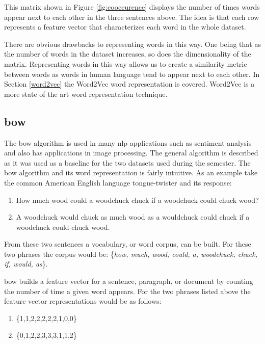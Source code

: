 \documentclass[12pt]{article}
\begin{document}
This matrix shown in Figure \ref{fig:cooccurence} displays the number of times words appear next to each other in the three sentences above. The idea is that each row represents a feature vector that characterizes each word in the whole dataset.

There are obvious drawbacks to representing words in this way. One being that as the number of words in the dataset increases, so does the dimensionality of the matrix. Representing words in this way allows us to create a similarity metric between words as words in human language tend to appear next to each other. In Section \ref{word2vec} the Word2Vec word representation is covered. Word2Vec is a more state of the art word representation technique.

\subsection {\ac{bow}}

The \ac{bow} algorithm is used in many \ac{nlp} applications such as sentiment analysis and also has applications in image processing. The general algorithm is described as it was used as a baseline for the two datasets used during the semester. The \ac{bow} algorithm and its word representation is  fairly intuitive. As an example take the common American English language tongue-twister and its response:

\begin{enumerate}
	\item How much wood could a woodchuck chuck if a woodchuck could chuck wood?
	\item A woodchuck would chuck as much wood as a wouldchuck could chuck if a woodchuck could chuck wood.
\end{enumerate} 

From these two sentences a vocabulary, or word corpus, can be built. For these two phrases the corpus would be: \{\textit{how, much, wood, could, a, woodchuck, chuck, if, would, as}\}.

\ac{bow} builds a feature vector for a sentence, paragraph, or document by counting the number of time a given word appears. For the two phrases listed above the feature vector representations would be as follows:

\begin{enumerate}
	\item \{1,1,2,2,2,2,2,1,0,0\}
	\item \{0,1,2,2,3,3,3,1,1,2\} 
\end{enumerate} 
\end{document}
